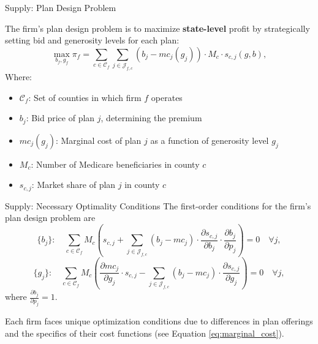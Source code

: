 \documentclass[professionalfonts, aspectratio=169]{beamer}
\begin{document}
\begin{frame}{Supply: Plan Design Problem}


The firm's plan design problem is to maximize \textbf{state-level} profit by strategically setting bid and generosity levels for each plan:
  \begin{equation}
    \label{eq:objective_function}
    \max_{b_f, g_f} \pi_{f} = \sum_{c \in \mathcal{C}_f } \sum_{j \in \mathcal{J}_{f,c} } (b_j - mc_j(g_j)) \cdot M_c \cdot s_{c,j}(g, b),
  \end{equation}
  Where:
    \begin{itemize}\small
      \item $\mathcal{C}_f$: Set of counties in which firm $f$ operates
      \item $b_j$: Bid price of plan $j$, determining the premium
      \item $mc_j(g_j)$: Marginal cost of plan $j$ as a function of generosity level $g_j$
      \item $M_c$: Number of Medicare beneficiaries in county $c$
      \item $s_{c,j}$: Market share of plan $j$ in county $c$
    \end{itemize}
\end{frame}

\begin{frame}{Supply: Necessary Optimality Conditions}
  The first-order conditions for the firm's plan design problem are
  \begin{equation}
    \label{eq:bid_foc}
        \{b_j\}: \quad \sum_{c \in \mathcal{C}_f} 
        M_c \left(s_{c,j} + \sum_{j \in \mathcal{J}_{f,c}} (b_j - mc_j) \cdot \frac{\partial s_{c,j}}{\partial b_j} \cdot
        \frac{\partial b_j}{\partial p_j} \right) = 0 
        \quad \forall j,
    \end{equation}
    \begin{equation}
    \label{eq:generosity_foc}
        \{g_j\}: \quad \sum_{c \in \mathcal{C}_f} 
        M_c \left( 
            \frac{\partial mc_j}{\partial g_j} \cdot s_{c,j} - 
            \sum_{j \in \mathcal{J}_{f,c}}
            (b_j - mc_j) \cdot \frac{\partial s_{c,j}}{\partial g_j}
        \right) = 0
        \quad \forall j,
    \end{equation}
    where $\frac{\partial b_j}{\partial p_j} = 1$.

    Each firm faces unique optimization conditions due to differences in plan offerings and the specifics of their cost functions (see Equation \ref{eq:marginal_cost}).

\end{frame}
\end{document}
